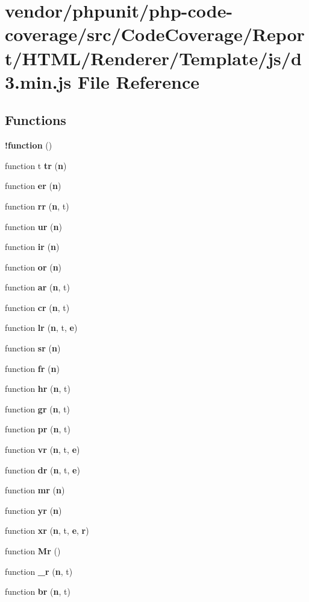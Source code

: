 \section{vendor/phpunit/php-\/code-\/coverage/src/\+Code\+Coverage/\+Report/\+H\+T\+M\+L/\+Renderer/\+Template/js/d3.min.\+js File Reference}
\label{d3_8min_8js}
\subsection*{Functions}
\begin{DoxyCompactItemize}
\item 
{\bf !function} ()
\item 
function t {\bf tr} ({\bf n})
\item 
function {\bf er} ({\bf n})
\item 
function {\bf rr} ({\bf n}, t)
\item 
function {\bf ur} ({\bf n})
\item 
function {\bf ir} ({\bf n})
\item 
function {\bf or} ({\bf n})
\item 
function {\bf ar} ({\bf n}, t)
\item 
function {\bf cr} ({\bf n}, t)
\item 
function {\bf lr} ({\bf n}, t, {\bf e})
\item 
function {\bf sr} ({\bf n})
\item 
function {\bf fr} ({\bf n})
\item 
function {\bf hr} ({\bf n}, t)
\item 
function {\bf gr} ({\bf n}, t)
\item 
function {\bf pr} ({\bf n}, t)
\item 
function {\bf vr} ({\bf n}, t, {\bf e})
\item 
function {\bf dr} ({\bf n}, t, {\bf e})
\item 
function {\bf mr} ({\bf n})
\item 
function {\bf yr} ({\bf n})
\item 
function {\bf xr} ({\bf n}, t, {\bf e}, {\bf r})
\item 
function {\bf Mr} ()
\item 
function {\bf \+\_\+r} ({\bf n}, t)
\item 
function {\bf br} ({\bf n}, t)

\end{DoxyCompactItemize}
